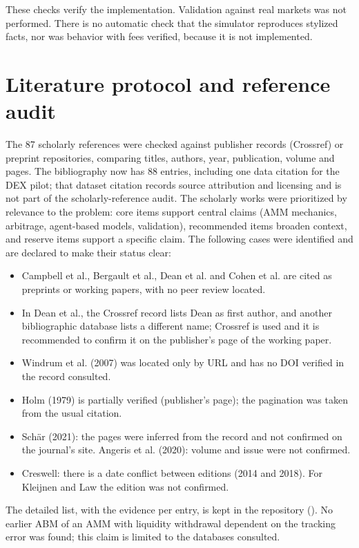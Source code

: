 These checks verify the implementation. Validation against real markets was not performed. There is no automatic check that the simulator reproduces stylized facts, nor was behavior with fees verified, because it is not implemented.

\section{Literature protocol and reference audit}
\label{sec:protocolo-literatura}

The 87 scholarly references were checked against publisher records (Crossref) or preprint repositories, comparing titles, authors, year, publication, volume and pages. The bibliography now has 88 entries, including one data citation for the DEX pilot; that dataset citation records source attribution and licensing and is not part of the scholarly-reference audit. The scholarly works were prioritized by relevance to the problem: core items support central claims (AMM mechanics, arbitrage, agent-based models, validation), recommended items broaden context, and reserve items support a specific claim. The following cases were identified and are declared to make their status clear:

\begin{itemize}
  \item Campbell et al., Bergault et al., Dean et al. and Cohen et al. are cited as preprints or working papers, with no peer review located.
  \item In Dean et al., the Crossref record lists Dean as first author, and another bibliographic database lists a different name; Crossref is used and it is recommended to confirm it on the publisher's page of the working paper.
  \item Windrum et al. (2007) was located only by URL and has no DOI verified in the record consulted.
  \item Holm (1979) is partially verified (publisher's page); the pagination was taken from the usual citation.
  \item Schär (2021): the pages were inferred from the record and not confirmed on the journal's site. Angeris et al. (2020): volume and issue were not confirmed.
  \item Creswell: there is a date conflict between editions (2014 and 2018). For Kleijnen and Law the edition was not confirmed.
\end{itemize}

The detailed list, with the evidence per entry, is kept in the repository (). No earlier ABM of an AMM with liquidity withdrawal dependent on the tracking error was found; this claim is limited to the databases consulted.

